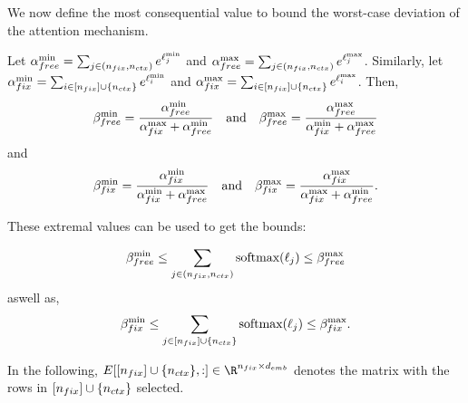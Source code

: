 
We now define the most consequential value to bound the worst-case deviation of the attention mechanism.
\begin{definition}\label{def:soft-extrem-values}
	Let $\alpha_{free}^{\min} = \sum_{j \in (n_{fix}, {n_{ctx}})} e^{\ell_j^{\min}}$ and $\alpha_{free}^{\max} = \sum_{j \in (n_{fix}, {n_{ctx}})} e^{\ell_j^{\max}}$.
	Similarly, let $\alpha_{fix}^{\min} = \sum_{i \in [n_{fix}] \cup \{{n_{ctx}}\}} e^{\ell_i^{\min}}$ and $\alpha_{fix}^{\max} = \sum_{i \in [n_{fix}] \cup \{{n_{ctx}}\}} e^{\ell_i^{\max}}$.
	Then, 
	\[
		{\beta}_{free}^{\min} = \frac{\alpha_{free}^{\min}}{\alpha_{fix}^{\max} + \alpha_{free}^{\min}} \quad \text{and} \quad {\beta}_{free}^{\max} = \frac{\alpha_{free}^{\max}}{\alpha_{fix}^{\min} + \alpha_{free}^{\max}}
	\]
	and
	\[
		{\beta}_{fix}^{\min} = \frac{\alpha_{fix}^{\min}}{\alpha_{fix}^{\min} + \alpha_{free}^{\max}} \quad \text{and} \quad {\beta}_{fix}^{\max} = \frac{\alpha_{fix}^{\max}}{\alpha_{fix}^{\max} + \alpha_{free}^{\min}}.
	\]
\end{definition}

These extremal values can be used to get the bounds:

\begin{lemma}
	\label{lem:min_max_softmax}
	\begin{equation}
		\label{eq:softmax_upper}
		{\beta}_{free}^{\min} \leq
		\sum_{j \in (n_{fix}, {n_{ctx}})} \text{softmax}(\ell_j) \leq
		{\beta}_{free}^{\max}
	\end{equation}
	aswell as,
	\begin{align}
		\label{eq:softmax_lower}
		{\beta}_{fix}^{\min} \leq
		\sum_{j \in [n_{fix}] \cup \{{n_{ctx}}\}} \text{softmax}(\ell_j) \leq
		{\beta}_{fix}^{\max}.
	\end{align}
\end{lemma}


In the following, $E[[\nfix] \cup \{\nctx\}, :] \in \R^{\nfix \times \dEmb}$ denotes the matrix with the rows in $[n_{fix}] \cup \{{n_{ctx}}\}$ selected. 

